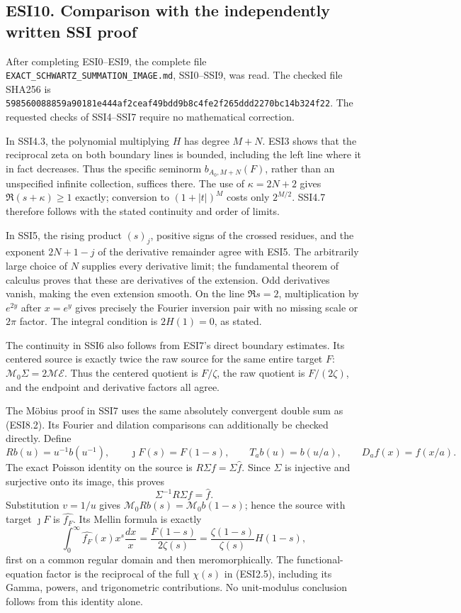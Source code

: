 \subsection{ESI10. Comparison with the independently written SSI
proof}\label{esi10.-comparison-with-the-independently-written-ssi-proof}

After completing ESI0--ESI9, the complete file
\nolinkurl{EXACT_SCHWARTZ_SUMMATION_IMAGE.md}, SSI0--SSI9, was read. The
checked file SHA256 is
\nolinkurl{598560088859a90181e444af2ceaf49bdd9b8c4fe2f265ddd2270bc14b324f22}.
The requested checks of SSI4--SSI7 require no mathematical correction.

In SSI4.3, the polynomial multiplying \(H\) has degree \(M+N\). ESI3
shows that the reciprocal zeta on both boundary lines is bounded,
including the left line where it in fact decreases. Thus the specific
seminorm \(b_{A_0,M+N}(F)\), rather than an unspecified infinite
collection, suffices there. The use of \(\kappa=2N+2\) gives
\(\Re(s+\kappa)\ge1\) exactly; conversion to \((1+|t|)^M\) costs only
\(2^{M/2}\). SSI4.7 therefore follows with the stated continuity and
order of limits.

In SSI5, the rising product \((s)_j\), positive signs of the crossed
residues, and the exponent \(2N+1-j\) of the derivative remainder agree
with ESI5. The arbitrarily large choice of \(N\) supplies every
derivative limit; the fundamental theorem of calculus proves that these
are derivatives of the extension. Odd derivatives vanish, making the
even extension smooth. On the line \(\Re s=2\), multiplication by
\(e^{2y}\) after \(x=e^y\) gives precisely the Fourier inversion pair
with no missing scale or \(2\pi\) factor. The integral condition is
\(2H(1)=0\), as stated.

The continuity in SSI6 also follows from ESI7's direct boundary
estimates. Its centered source is exactly twice the raw source for the
same entire target \(F\): \(\mathcal M_0\Sigma=2\mathcal M\mathcal E\).
Thus the centered quotient is \(F/\zeta\), the raw quotient is
\(F/(2\zeta)\), and the endpoint and derivative factors all agree.

The Möbius proof in SSI7 uses the same absolutely convergent double sum
as (ESI8.2). Its Fourier and dilation comparisons can additionally be
checked directly. Define \[
Rb(u)=u^{-1}b(u^{-1}),\qquad
\jmath F(s)=F(1-s),\qquad
T_ab(u)=b(u/a),\qquad D_af(x)=f(x/a).
\tag{ESI10.1}
\] The exact Poisson identity on the source is
\(R\Sigma f=\Sigma\widehat f\). Since \(\Sigma\) is injective and
surjective onto its image, this proves \[
\Sigma^{-1}R\Sigma f=\widehat f.
\tag{ESI10.2}
\] Substitution \(v=1/u\) gives
\(\mathcal M_0Rb(s)=\mathcal M_0b(1-s)\); hence the source with target
\(\jmath F\) is \(\widehat{f_F}\). Its Mellin formula is exactly \[
\int_0^\infty\widehat{f_F}(x)x^s\frac{dx}{x}
=\frac{F(1-s)}{2\zeta(s)}
=\frac{\zeta(1-s)}{\zeta(s)}H(1-s),
\tag{ESI10.3}
\] first on a common regular domain and then meromorphically. The
functional-equation factor is the reciprocal of the full \(\chi(s)\) in
(ESI2.5), including its Gamma, powers, and trigonometric contributions.
No unit-modulus conclusion follows from this identity alone.

